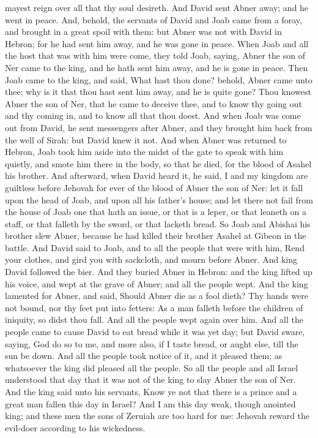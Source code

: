 mayest reign over all that thy soul desireth. And David sent Abner away; and he went in peace.  And, behold, the servants of David and Joab came from a foray, and brought in a great spoil with them: but Abner was not with David in Hebron; for he had sent him away, and he was gone in peace. When Joab and all the host that was with him were come, they told Joab, saying, Abner the son of Ner came to the king, and he hath sent him away, and he is gone in peace. Then Joab came to the king, and said, What hast thou done? behold, Abner came unto thee; why is it that thou hast sent him away, and he is quite gone? Thou knowest Abner the son of Ner, that he came to deceive thee, and to know thy going out and thy coming in, and to know all that thou doest. And when Joab was come out from David, he sent messengers after Abner, and they brought him back from the well of Sirah: but David knew it not.  And when Abner was returned to Hebron, Joab took him aside into the midst of the gate to speak with him quietly, and smote him there in the body, so that he died, for the blood of Asahel his brother. And afterward, when David heard it, he said, I and my kingdom are guiltless before Jehovah for ever of the blood of Abner the son of Ner: let it fall upon the head of Joab, and upon all his father’s house; and let there not fail from the house of Joab one that hath an issue, or that is a leper, or that leaneth on a staff, or that falleth by the sword, or that lacketh bread. So Joab and Abishai his brother slew Abner, because he had killed their brother Asahel at Gibeon in the battle.  And David said to Joab, and to all the people that were with him, Rend your clothes, and gird you with sackcloth, and mourn before Abner. And king David followed the bier. And they buried Abner in Hebron: and the king lifted up his voice, and wept at the grave of Abner; and all the people wept. And the king lamented for Abner, and said, Should Abner die as a fool dieth?  Thy hands were not bound, nor thy feet put into fetters: As a man falleth before the children of iniquity, so didst thou fall. And all the people wept again over him. And all the people came to cause David to eat bread while it was yet day; but David sware, saying, God do so to me, and more also, if I taste bread, or aught else, till the sun be down. And all the people took notice of it, and it pleased them; as whatsoever the king did pleased all the people. So all the people and all Israel understood that day that it was not of the king to slay Abner the son of Ner. And the king said unto his servants, Know ye not that there is a prince and a great man fallen this day in Israel? And I am this day weak, though anointed king; and these men the sons of Zeruiah are too hard for me: Jehovah reward the evil-doer according to his wickedness. 

